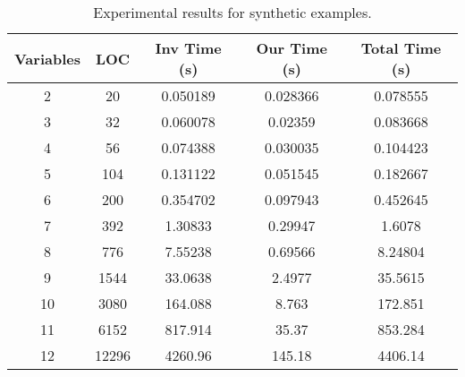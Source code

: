 \begin{center}
\begin{table}[]
  \centering
   \begin{tabular}{c|c|c|c|c}

{Variables} & {LOC} & {Inv Time (s)} & {Our Time (s)} & {Total Time (s)} \\\hline
{2} & {20} & {0.050189} & {0.028366} & {0.078555} \\\hline
{3} & {32} & {0.060078} & {0.02359} & {0.083668} \\\hline
{4} & {56} & {0.074388} & {0.030035} & {0.104423} \\\hline
{5} & {104} & {0.131122} & {0.051545} & {0.182667} \\\hline
{6} & {200} & {0.354702} & {0.097943} & {0.452645} \\\hline
{7} & {392} & {1.30833} & {0.29947} & {1.6078} \\\hline
{8} & {776} & {7.55238} & {0.69566} & {8.24804} \\\hline
{9} & {1544} & {33.0638} & {2.4977} & {35.5615} \\\hline
{10} & {3080} & {164.088} & {8.763} & {172.851} \\\hline
{11} & {6152} & {817.914} & {35.37} & {853.284} \\\hline
{12} & {12296} & {4260.96} & {145.18} & {4406.14} \\\hline
\end{tabular}
\caption{Experimental results for synthetic examples.}\label{tab:exp2}
\end{table}
\end{center}
